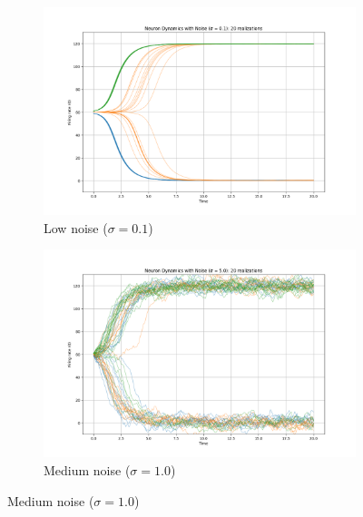 \documentclass{article}
\begin{document}
\begin{figure}[H]
    \centering
    \begin{subfigure}[b]{0.48\textwidth}
        \includegraphics[width=\textwidth]{noise_strength_0.1.png}
        \caption{Low noise ($\sigma = 0.1$)}
        \label{fig:noise_low}
    \end{subfigure}
    \hfill
    \begin{subfigure}[b]{0.48\textwidth}
        \includegraphics[width=\textwidth]{noise_strength_5.0.png}
        \caption{Medium noise ($\sigma = 1.0$)}
        \label{fig:noise_medium}
    \end{subfigure}
    

\end{figure}
\end{document}
